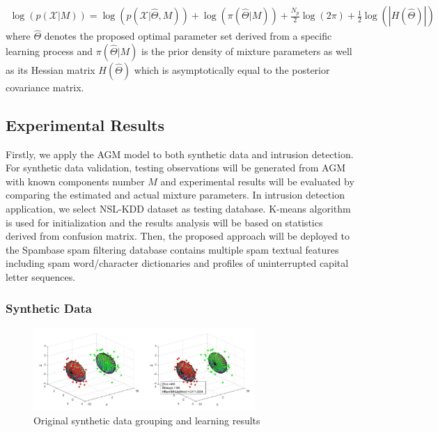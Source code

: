 \begin{multline}
\log(p(\mathcal{X}|M)) = \log(p(\mathcal{X}|\hat{\Theta},M)) + \log(\pi(\hat{\Theta}|M))+ \frac{N_p}{2}\log(2\pi)+\frac{1}{2}\log(|H(\hat{\Theta})|)
\label{eq:margLikeli}
\end{multline}
where $\hat{\Theta}$ denotes the proposed optimal parameter set derived from a specific learning process and $\pi(\hat{\Theta}|M)$ is the prior density of mixture parameters as well as its Hessian matrix $H(\hat{\Theta})$ which is asymptotically equal to the posterior covariance matrix.



\subsection{Experimental Results}
\label{sec:2.5}


Firstly, we apply the AGM model to both synthetic data and intrusion detection. For synthetic data validation, testing observations will be generated from AGM with known components number $M$ and experimental results will be evaluated by comparing the estimated and actual mixture parameters. In intrusion detection application, we select NSL-KDD dataset \cite{Tavallaee2009} as testing database. K-means algorithm is used for initialization and the results analysis will be based on statistics derived from confusion matrix. Then, the proposed approach will be deployed to the Spambase spam filtering database contains multiple spam textual features including spam word/character dictionaries and profiles of uninterrupted capital letter sequences.

\subsubsection{Synthetic Data}
\label{sec:2.5.1}

\begin{figure}
\includegraphics[width=0.75\textwidth]{syn.jpg}
\caption{Original synthetic data grouping and learning results}
\label{fig:syn1}
\end{figure}

